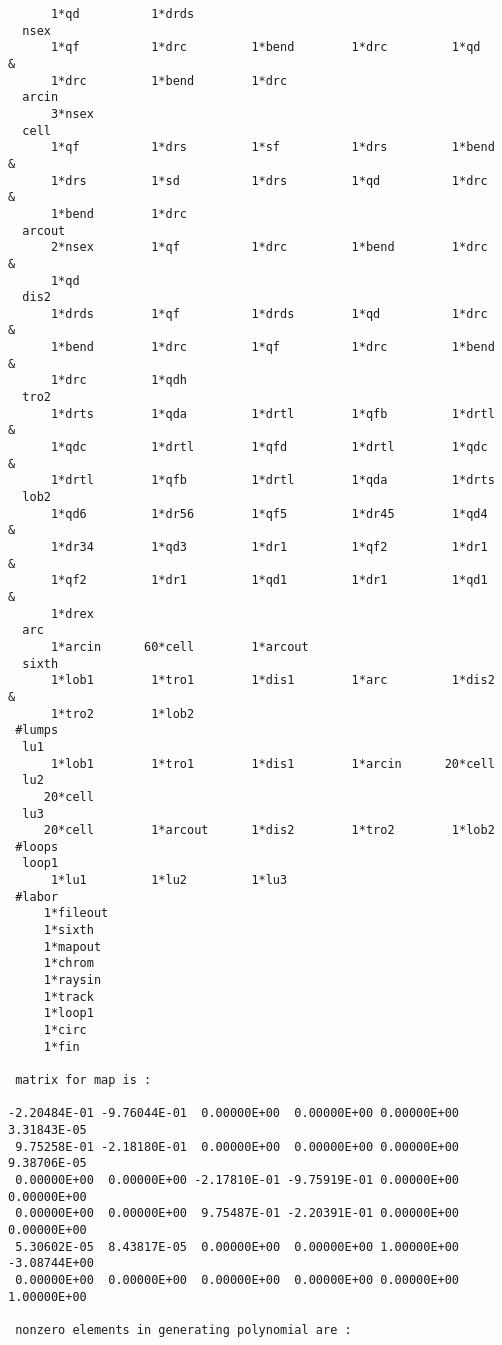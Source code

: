{\begin{verbatim}
      1*qd          1*drds
  nsex
      1*qf          1*drc         1*bend        1*drc         1*qd       &
      1*drc         1*bend        1*drc
  arcin
      3*nsex
  cell
      1*qf          1*drs         1*sf          1*drs         1*bend     &
      1*drs         1*sd          1*drs         1*qd          1*drc      &
      1*bend        1*drc
  arcout
      2*nsex        1*qf          1*drc         1*bend        1*drc      &
      1*qd
  dis2
      1*drds        1*qf          1*drds        1*qd          1*drc      &
      1*bend        1*drc         1*qf          1*drc         1*bend     &
      1*drc         1*qdh
  tro2
      1*drts        1*qda         1*drtl        1*qfb         1*drtl     &
      1*qdc         1*drtl        1*qfd         1*drtl        1*qdc      &
      1*drtl        1*qfb         1*drtl        1*qda         1*drts
  lob2
      1*qd6         1*dr56        1*qf5         1*dr45        1*qd4      &
      1*dr34        1*qd3         1*dr1         1*qf2         1*dr1      &
      1*qf2         1*dr1         1*qd1         1*dr1         1*qd1      &
      1*drex
  arc
      1*arcin      60*cell        1*arcout
  sixth
      1*lob1        1*tro1        1*dis1        1*arc         1*dis2     &
      1*tro2        1*lob2
 #lumps
  lu1
      1*lob1        1*tro1        1*dis1        1*arcin      20*cell
  lu2
     20*cell
  lu3
     20*cell        1*arcout      1*dis2        1*tro2        1*lob2
 #loops
  loop1
      1*lu1         1*lu2         1*lu3
 #labor
     1*fileout
     1*sixth
     1*mapout
     1*chrom
     1*raysin
     1*track
     1*loop1
     1*circ
     1*fin

 matrix for map is :

-2.20484E-01 -9.76044E-01  0.00000E+00  0.00000E+00 0.00000E+00  3.31843E-05
 9.75258E-01 -2.18180E-01  0.00000E+00  0.00000E+00 0.00000E+00  9.38706E-05
 0.00000E+00  0.00000E+00 -2.17810E-01 -9.75919E-01 0.00000E+00  0.00000E+00
 0.00000E+00  0.00000E+00  9.75487E-01 -2.20391E-01 0.00000E+00  0.00000E+00
 5.30602E-05  8.43817E-05  0.00000E+00  0.00000E+00 1.00000E+00 -3.08744E+00
 0.00000E+00  0.00000E+00  0.00000E+00  0.00000E+00 0.00000E+00  1.00000E+00

 nonzero elements in generating polynomial are :


\end{verbatim}}
